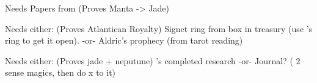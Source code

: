 \documentclass[green]{NeptuneBall}
\begin{document}
\name{\gLineage{}}

Needs Papers from \cDiplomat{} (Proves Manta -> Jade)

Needs either:  (Proves Atlantican Royalty)
Signet ring from box in treasury (use \cPrince{}'s ring to get it open).
-or-
Aldric's prophecy (from tarot reading)

Needs either: (Proves jade + neputune)
\cSpy{}'s completed research
-or-
Journal? ( 2 sense magics, then do x to it)
\end{document}

